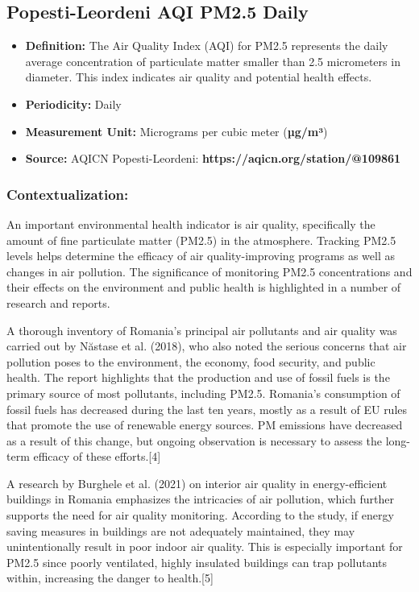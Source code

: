 \documentclass{article} %
\begin{document}
\subsection{Popesti-Leordeni AQI PM2.5 Daily}
\begin{itemize}
    \item \textbf{Definition:} The Air Quality Index (AQI) for PM2.5 represents the daily average concentration of particulate matter smaller than 2.5 micrometers in diameter. This index indicates air quality and potential health effects.
    \item \textbf{Periodicity:} Daily
    \item \textbf{Measurement Unit:} Micrograms per cubic meter (\textbf{µg/m³})
    \item \textbf{Source:} AQICN Popesti-Leordeni: \textbf{https://aqicn.org/station/@109861}
\end{itemize}

\subsubsection*{Contextualization:}
An important environmental health indicator is air quality, specifically the amount of fine particulate matter (PM2.5) in the atmosphere. Tracking PM2.5 levels helps determine the efficacy of air quality-improving programs as well as changes in air pollution. The significance of monitoring PM2.5 concentrations and their effects on the environment and public health is highlighted in a number of research and reports.

A thorough inventory of Romania's principal air pollutants and air quality was carried out by Năstase et al. (2018), who also noted the serious concerns that air pollution poses to the environment, the economy, food security, and public health. The report highlights that the production and use of fossil fuels is the primary source of most pollutants, including PM2.5. Romania's consumption of fossil fuels has decreased during the last ten years, mostly as a result of EU rules that promote the use of renewable energy sources. PM emissions have decreased as a result of this change, but ongoing observation is necessary to assess the long-term efficacy of these efforts.[4]

A research by Burghele et al. (2021) on interior air quality in energy-efficient buildings in Romania emphasizes the intricacies of air pollution, which further supports the need for air quality monitoring. According to the study, if energy saving measures in buildings are not adequately maintained, they may unintentionally result in poor indoor air quality. This is especially important for PM2.5 since poorly ventilated, highly insulated buildings can trap pollutants within, increasing the danger to health.[5]
\end{document}

